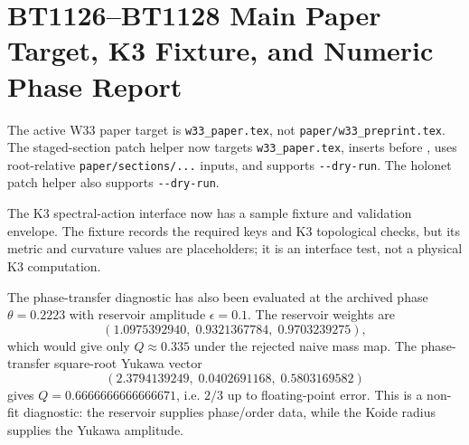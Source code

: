 \section{BT1126--BT1128 Main Paper Target, K3 Fixture, and Numeric Phase Report}
\label{sec:bt1126-bt1128-mainpaper-fixture-numeric}

The active W33 paper target is \texttt{w33\_paper.tex}, not \texttt{paper/w33\_preprint.tex}.  The staged-section patch helper now targets \texttt{w33\_paper.tex}, inserts before \verb||, uses root-relative \verb|paper/sections/...| inputs, and supports \verb|--dry-run|.  The holonet patch helper also supports \verb|--dry-run|.

The K3 spectral-action interface now has a sample fixture and validation envelope.  The fixture records the required keys and K3 topological checks, but its metric and curvature values are placeholders; it is an interface test, not a physical K3 computation.

The phase-transfer diagnostic has also been evaluated at the archived phase $\theta=0.2223$ with reservoir amplitude $\epsilon=0.1$.  The reservoir weights are
\[
(1.0975392940,\;0.9321367784,\;0.9703239275),
\]
which would give only $Q\approx0.335$ under the rejected naive mass map.  The phase-transfer square-root Yukawa vector
\[
(2.3794139249,\;0.0402691168,\;0.5803169582)
\]
gives $Q=0.6666666666666671$, i.e. $2/3$ up to floating-point error.  This is a non-fit diagnostic: the reservoir supplies phase/order data, while the Koide radius supplies the Yukawa amplitude.

